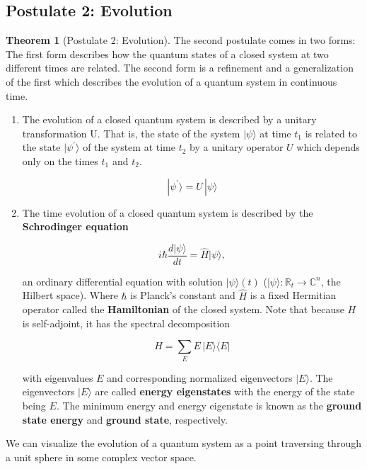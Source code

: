 \documentclass{article}
\theoremstyle{definition}
\newtheorem{theorem}{Theorem}[section]
\begin{document}
  \subsection{Postulate 2: Evolution}

    \begin{theorem}[Postulate 2: Evolution]
      The second postulate comes in two forms: The first form describes how the quantum states of a closed system at two different times are related. The second form is a refinement and a generalization of the first which describes the evolution of a quantum system in continuous time.
      \begin{enumerate}
        \item The evolution of a closed quantum system is described by a unitary transformation U. That is, the state of the system $|\psi \rangle$ at time $t_1$ is related to the state $|\psi^\prime \rangle$ of the system at time $t_2$ by a unitary operator $U$ which depends only on the times $t_1$ and $t_2$.

          \[|\psi^\prime \rangle = U \, |\psi \rangle\]

        \item The time evolution of a closed quantum system is described by the \textbf{Schrodinger equation}

            \[i \hbar \frac{d |\psi \rangle}{dt} = \hat{H} |\psi \rangle, \]

          an ordinary differential equation with solution $| \psi \rangle (t)$ ($|\psi\rangle: \mathbb{R}_t \longrightarrow \mathbb{C}^n$, the Hilbert space). Where $\hbar$ is Planck's constant and $\hat{H}$ is a fixed Hermitian operator called the \textbf{Hamiltonian} of the closed system. Note that because $H$ is self-adjoint, it has the spectral decomposition

            \[H = \sum_{E} E \, |E \rangle \langle E |\]

          with eigenvalues $E$ and corresponding normalized eigenvectors $|E \rangle$. The eigenvectors $|E \rangle$ are called \textbf{energy eigenstates} with the energy of the state being $E$. The minimum energy and energy eigenstate is known as the \textbf{ground state energy} and \textbf{ground state}, respectively.
      \end{enumerate}

      We can visualize the evolution of a quantum system as a point traversing through a unit sphere in some complex vector space. 
    \end{theorem}
\end{document}
